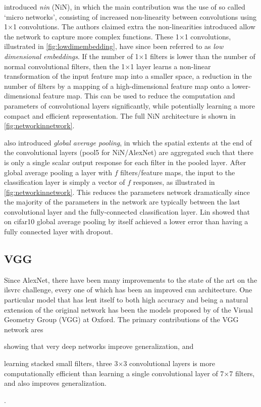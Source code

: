\documentclass[thesis]{subfiles}
\begin{document}
\citet{Lin2013NiN} introduced \emph{\gls{nin}} (NiN), in which the main contribution was the use of so called `micro networks', consisting of increased non-linearity between convolutions using 1$\times$1 convolutions. The authors claimed extra the non-linearities introduced allow the network to capture more complex functions. These 1$\times $1 convolutions, illustrated in \cref{fig:lowdimembedding}, have since been referred to as \emph{low dimensional embeddings}. If the number of 1$\times$1 filters is lower than the number of normal convolutional filters, then the 1$\times$1 layer learns a non-linear transformation of the input feature map into a smaller space, \ie a reduction in the number of filters by a mapping of a high-dimensional feature map onto a lower-dimensional feature map. This can be used to reduce the computation and parameters of convolutional layers significantly, while potentially learning a more compact and efficient representation. The full NiN architecture is shown in \cref{fig:networkinnetwork}.

\citet{Lin2013NiN} also introduced \emph{global average pooling}, in which the spatial extents at the end of the convolutional layers (\ie pool5 for NiN/AlexNet) are aggregated such that there is only a single scalar output response for each filter in the pooled layer. After global average pooling a layer with $f$ filters/feature maps, the input to the classification layer is simply a vector of $f$ responses, as illustrated in \cref{fig:networkinnetwork}. This reduces the parameters network dramatically since the majority of the parameters in the network are typically between the last convolutional layer and the fully-connected classification layer. Lin \etal showed that on \gls{cifar10} global average pooling by itself achieved a lower error than having a fully connected layer with dropout.

\subsection{VGG}
Since AlexNet, there have been many improvements to the state of the art on the \gls{ilsvrc} challenge, every one of which has been an improved \gls{cnn} architecture. One particular model that has lent itself to both high accuracy and being a natural extension of the original network has been the models proposed by \citet{Simonyan2014verydeep} of the Visual Geometry Group (VGG) at Oxford. The primary contributions of the VGG network ares
\begin{enumerate*}[label = (\textbf{\roman*})]
\item showing that very deep networks improve generalization, and
\item learning stacked small filters, \ie three 3$\times$3 convolutional layers is more computationally efficient than learning a single convolutional layer of 7$\times$7 filters, and also improves generalization.
\end{enumerate*}.
\end{document}
